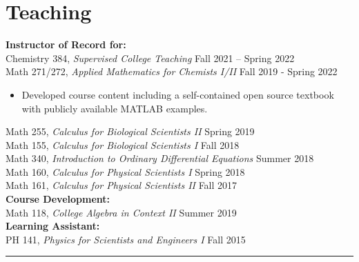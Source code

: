 \documentclass[12pt]{article} %
\begin{document}
\section{Teaching}
\begin{flushleft}
\textbf{Instructor of Record for:} \\
\vspace*{5pt}
Chemistry 384, \emph{Supervised College Teaching} \hfill Fall 2021 -- Spring 2022\\
\vspace*{5pt}
Math 271/272, \emph{Applied Mathematics for Chemists I/II} \hfill Fall 2019 - Spring 2022\\
\begin{itemize}
\item Developed course content including a self-contained open source textbook with publicly available MATLAB examples.
\end{itemize}
\vspace*{5pt}
Math 255, \emph{Calculus for Biological Scientists II} \hfill Spring 2019\\
\vspace*{5pt}
Math 155, \emph{Calculus for Biological Scientists I} \hfill Fall 2018\\
\vspace*{5pt}
Math 340, \emph{Introduction to Ordinary Differential Equations} \hfill Summer 2018\\
\vspace*{5pt}
Math 160, \emph{Calculus for Physical Scientists I} \hfill Spring 2018\\
\vspace*{5pt}
Math 161, \emph{Calculus for Physical Scientists II} \hfill Fall 2017\\
\vspace*{5pt}
\textbf{Course Development:}\\
Math 118, \emph{College Algebra in Context II} \hfill Summer 2019\\
\vspace*{5pt}
\textbf{Learning Assistant:} \\
PH 141, \emph{Physics for Scientists and Engineers I} \hfill Fall 2015
\end{flushleft}
\rule{\textwidth}{0.5mm}

\end{document}
